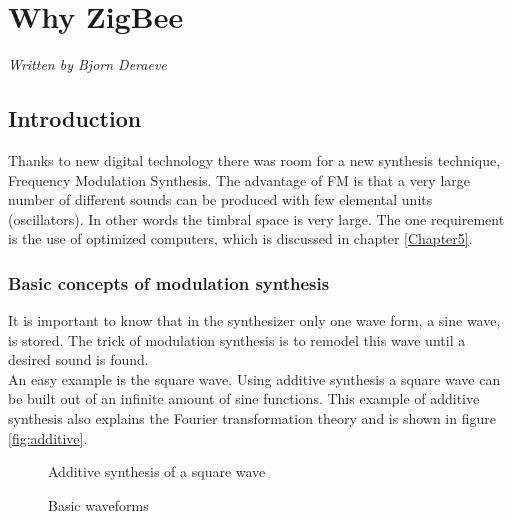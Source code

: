 \chapter{Why ZigBee} %
\label{Chapter2} %
\textsf{\textsl{Written by Bjorn Deraeve}}

\section{Introduction}
Thanks to new digital technology there was room for a new synthesis technique, Frequency Modulation Synthesis. The advantage of FM is that a very large number of different sounds can be produced with few elemental units (oscillators). In other words the timbral space is very large. The one requirement is the use of optimized computers, which is discussed in chapter \ref{Chapter5}.

\subsection{Basic concepts of modulation synthesis}
It is important to know that in the synthesizer only one wave form, a sine wave, is stored. The trick of modulation synthesis is to remodel this wave until a desired sound is found. \\ An easy example is the square wave. Using additive synthesis a square wave can be built out of an infinite amount of sine functions. This example of additive synthesis also explains the Fourier transformation theory and is shown in figure \ref{fig:additive}.
\begin{figure}[ht]
  \hfill
  \begin{minipage}[t]{.45\textwidth}
    \begin{center}  
      \caption{Additive synthesis of a square wave}
      \label{fig:additive}
    \end{center}
  \end{minipage}
  \hfill
  \begin{minipage}[t]{.45\textwidth}
    \begin{center}  
      \caption{Basic waveforms}
      \label{fig:basicWaveforms}
    \end{center}
  \end{minipage}
  \hfill
\end{figure}
